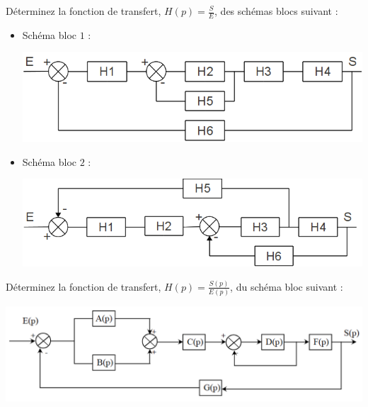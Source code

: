 
D\'eterminez la fonction de transfert, $H(p)= \frac{S}{E}$, des schémas blocs suivant :
\begin{itemize}
\item Sch\'ema bloc $1$ :
\begin{center}
\includegraphics[scale=0.8]{png/schemabloc1.png}
\end{center}
\item Sch\'ema bloc $2$ :
\begin{center}
\includegraphics[scale=0.8]{png/schemabloc2.png}
\end{center}
\end{itemize}

\newpage


D\'eterminez la fonction de transfert, $H(p)= \frac{S(p)}{E(p)}$, du schéma bloc suivant :

\begin{center}
\includegraphics[scale=0.4]{png/SB3.png}
\end{center}

